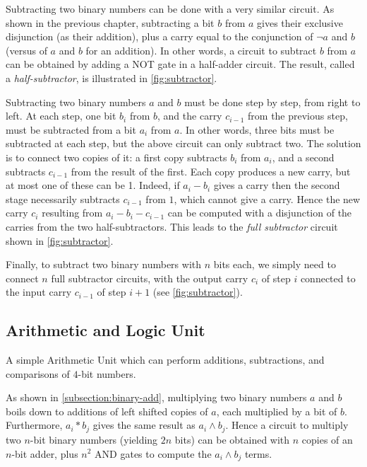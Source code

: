 Subtracting two binary numbers can be done with a very similar circuit. As
shown in the previous chapter, subtracting a bit $b$ from $a$ gives their
exclusive disjunction (as their addition), plus a carry equal to the
conjunction of $\neg a$ and $b$ (versus of $a$ and $b$ for an addition). In
other words, a circuit to subtract $b$ from $a$ can be obtained by adding a NOT
gate in a half-adder circuit. The result, called a {\em half-subtractor}, is
illustrated in \cref{fig:subtractor}.

Subtracting two binary numbers $a$ and $b$ must be done step by step, from
right to left. At each step, one bit $b_i$ from $b$, and the carry $c_{i-1}$
from the previous step, must be subtracted from a bit $a_i$ from $a$. In other
words, three bits must be subtracted at each step, but the above circuit can
only subtract two. The solution is to connect two copies of it: a first copy
subtracts $b_i$ from $a_i$, and a second subtracts $c_{i-1}$ from the result of
the first. Each copy produces a new carry, but at most one of these can be 1.
Indeed, if $a_i-b_i$ gives a carry then the second stage necessarily subtracts
$c_{i-1}$ from $1$, which cannot give a carry. Hence the new carry $c_i$
resulting from $a_i-b_i-c_{i-1}$ can be computed with a disjunction of the
carries from the two half-subtractors. This leads to the {\em full subtractor}
circuit shown in \cref{fig:subtractor}.

Finally, to subtract two binary numbers with $n$ bits each, we simply need to
connect $n$ full subtractor circuits, with the output carry $c_i$ of step $i$
connected to the input carry $c_{i-1}$ of step $i+1$ (see
\cref{fig:subtractor}).

\subsection{Arithmetic and Logic Unit}

\begin{Figure}
  

  \caption{A simple Arithmetic Unit which can perform additions, subtractions,
    and comparisons of $4$-bit numbers.}\label{fig:alu}
\end{Figure}

As shown in \cref{subsection:binary-add}, multiplying two binary numbers $a$
and $b$ boils down to additions of left shifted copies of $a$, each multiplied
by a bit of $b$. Furthermore, $a_i * b_j$ gives the same result as $a_i \wedge
b_j$. Hence a circuit to multiply two $n$-bit binary numbers (yielding $2n$
bits) can be obtained with $n$ copies of an $n$-bit adder, plus $n^2$ AND gates
to compute the $a_i \wedge b_j$ terms.

